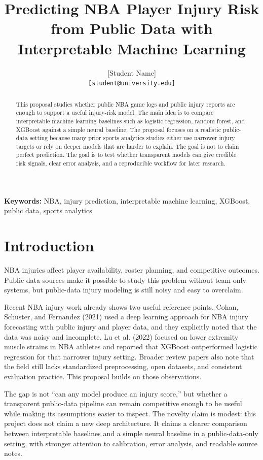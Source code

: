 \documentclass[11pt]{article}
\title{Predicting NBA Player Injury Risk from Public Data with Interpretable Machine Learning}
\author{[Student Name] \\ \texttt{[student@university.edu]} \\ [University / Program]}
\date{}
\begin{document}
\maketitle

\begin{abstract}
This proposal studies whether public NBA game logs and public injury reports are enough to support a useful injury-risk model. The main idea is to compare interpretable machine learning baselines such as logistic regression, random forest, and XGBoost against a simple neural baseline. The proposal focuses on a realistic public-data setting because many prior sports analytics studies either use narrower injury targets or rely on deeper models that are harder to explain. The goal is not to claim perfect prediction. The goal is to test whether transparent models can give credible risk signals, clear error analysis, and a reproducible workflow for later research.
\end{abstract}

\textbf{Keywords:} NBA, injury prediction, interpretable machine learning, XGBoost, public data, sports analytics

\section{Introduction}
NBA injuries affect player availability, roster planning, and competitive outcomes. Public data sources make it possible to study this problem without team-only systems, but public-data injury modeling is still noisy and easy to overclaim.

Recent NBA injury work already shows two useful reference points. Cohan, Schuster, and Fernandez (2021) used a deep learning approach for NBA injury forecasting with public injury and player data, and they explicitly noted that the data was noisy and incomplete. Lu et al. (2022) focused on lower extremity muscle strains in NBA athletes and reported that XGBoost outperformed logistic regression for that narrower injury setting. Broader review papers also note that the field still lacks standardized preprocessing, open datasets, and consistent evaluation practice. This proposal builds on those observations.

The gap is not ``can any model produce an injury score,'' but whether a transparent public-data pipeline can remain competitive enough to be useful while making its assumptions easier to inspect. The novelty claim is modest: this project does not claim a new deep architecture. It claims a clearer comparison between interpretable baselines and a simple neural baseline in a public-data-only setting, with stronger attention to calibration, error analysis, and readable source notes.
\end{document}
